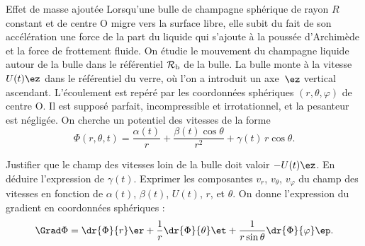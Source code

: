 \begin{exo}[PC][2][devoir]{Effet de masse ajoutée}%
Lorsqu'une bulle de champagne sphérique de rayon $R$ constant et de centre O migre vers la surface libre, elle subit du fait de son accélération une force de la part du liquide qui s’ajoute à la poussée d’Archimède et la force de frottement fluide. On étudie le mouvement du champagne liquide autour de la bulle dans le référentiel $\mathcal{R}_{\rm{b}}$ de la bulle. La bulle monte à la vitesse $U(t)\ez$ dans le référentiel du verre, où l'on a introduit un axe~$\ez$ vertical ascendant. L’écoulement est repéré par les coordonnées sphériques $(r,\theta,\varphi)$ de centre O. Il est supposé parfait, incompressible et irrotationnel, et la pesanteur est négligée. On cherche un potentiel des vitesses  de la forme
\begin{equation*}
\Phi(r,\theta,t)=\frac{\alpha(t)}{r}+\frac{\beta(t)\cos\theta}{r^2}+\gamma(t)\,r\cos\theta.
\end{equation*}
\begin{quest}
\item Justifier que le champ des vitesses loin de la bulle doit valoir $-U(t)\ez$. En déduire l'expression de $\gamma(t)$. Exprimer les composantes $v_r$, $v_\theta$, $v_\varphi$ du champ des vitesses en fonction de $\alpha(t)$, $\beta(t)$, $U(t)$, $r$, et $\theta$. On donne l'expression du gradient en coordonnées sphériques :
$$
\Grad \Phi = \dr{\Phi}{r} \er + \frac{1}{r} \dr{\Phi}{\theta} \et + \frac{1}{r\sin\theta} \dr{\Phi}{\varphi} \ep.
$$




\end{quest}
\end{exo}
